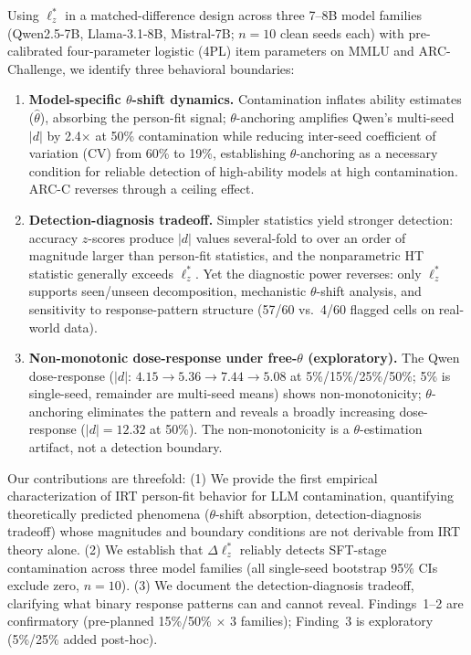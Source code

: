 Using $\ell_z^*$ in a matched-difference design across three 7--8B model families (Qwen2.5-7B, Llama-3.1-8B, Mistral-7B; $n{=}10$ clean seeds each) with pre-calibrated four-parameter logistic (4PL) item parameters \citep{psnirt2026} on MMLU \citep{hendrycks2021mmlu} and ARC-Challenge, we identify three behavioral boundaries:

\begin{enumerate}[leftmargin=*,nosep]
\item \textbf{Model-specific $\theta$-shift dynamics.} Contamination inflates ability estimates ($\hat{\theta}$), absorbing the person-fit signal; $\theta$-anchoring amplifies Qwen's multi-seed $|d|$ by 2.4$\times$ at 50\% contamination while reducing inter-seed coefficient of variation (CV) from 60\% to 19\%, establishing $\theta$-anchoring as a necessary condition for reliable detection of high-ability models at high contamination. ARC-C reverses through a ceiling effect.

\item \textbf{Detection-diagnosis tradeoff.} Simpler statistics yield stronger detection: accuracy $z$-scores produce $|d|$ values several-fold to over an order of magnitude larger than person-fit statistics, and the nonparametric HT statistic \citep{vanderflier1982} generally exceeds $\ell_z^*$. Yet the diagnostic power reverses: only $\ell_z^*$ supports seen/unseen decomposition, mechanistic $\theta$-shift analysis, and sensitivity to response-pattern structure (57/60 vs.\ 4/60 flagged cells on real-world data).

\item \textbf{Non-monotonic dose-response under free-$\theta$ (exploratory).} The Qwen dose-response ($|d|$: $4.15 \to 5.36 \to 7.44 \to 5.08$ at 5\%/15\%/25\%/50\%; 5\% is single-seed, remainder are multi-seed means) shows non-monotonicity; $\theta$-anchoring eliminates the pattern and reveals a broadly increasing dose-response ($|d|{=}12.32$ at 50\%). The non-monotonicity is a $\theta$-estimation artifact, not a detection boundary.
\end{enumerate}

Our contributions are threefold:
(1) We provide the first empirical characterization of IRT person-fit behavior for LLM contamination, quantifying theoretically predicted phenomena ($\theta$-shift absorption, detection-diagnosis tradeoff) whose magnitudes and boundary conditions are not derivable from IRT theory alone.
(2) We establish that $\Delta\ell_z^*$ reliably detects SFT-stage contamination across three model families (all single-seed bootstrap 95\% CIs exclude zero, $n{=}10$).
(3) We document the detection-diagnosis tradeoff, clarifying what binary response patterns can and cannot reveal.
Findings~1--2 are confirmatory (pre-planned 15\%/50\% $\times$ 3 families); Finding~3 is exploratory (5\%/25\% added post-hoc).
